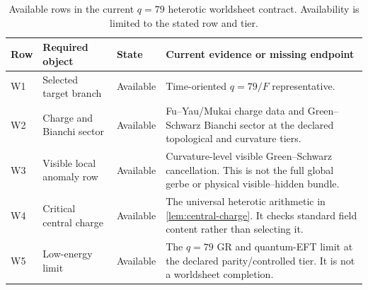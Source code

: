 \documentclass[11pt]{article}
\theoremstyle{definition}
\theoremstyle{remark}
\begin{document}
\begin{table}[htbp]
\centering
\small
\begin{tabularx}{\textwidth}{@{}p{}p{}p{}X@{}}
\toprule
Row & Required object & State & Current evidence or missing endpoint \\
\midrule
W1 & Selected target branch & Available &
Time-oriented \(q=79/F\) representative. \\
W2 & Charge and Bianchi sector & Available &
Fu--Yau/Mukai charge data and Green--Schwarz Bianchi sector at the declared
topological and curvature tiers. \\
W3 & Visible local anomaly row & Available &
Curvature-level visible Green--Schwarz cancellation.  This is not the full
global gerbe or physical visible--hidden bundle. \\
W4 & Critical central charge & Available &
The universal heterotic arithmetic in \cref{lem:central-charge}.  It checks
standard field content rather than selecting it. \\
W5 & Low-energy limit & Available &
The \(q=79\) GR and quantum-EFT limit at the declared parity/controlled tier.
It is not a worldsheet completion. \\
\bottomrule
\end{tabularx}
\caption{Available rows in the current \(q=79\) heterotic worldsheet
contract.  Availability is limited to the stated row and tier.}
\label{tab:q79-available}
\end{table}
\end{document}
